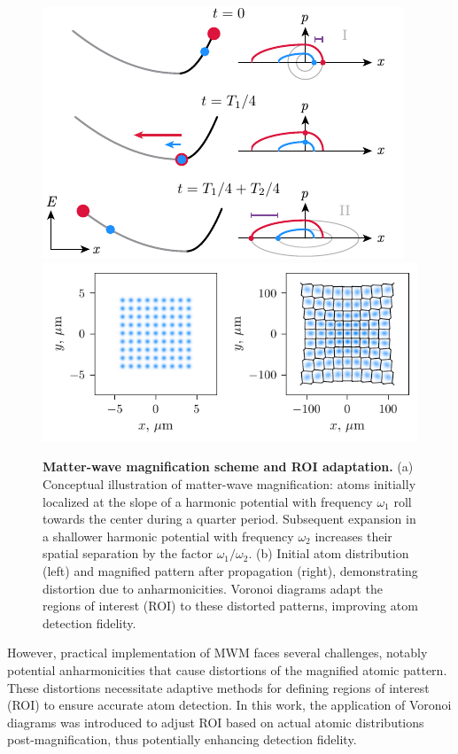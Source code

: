 \begin{figure}
    \centering
    \includegraphics{fig-ai/mwm-scheme.pdf}
    \includegraphics{fig-py/mwm.pdf}
    \caption{
    \textbf{Matter-wave magnification scheme and ROI adaptation.}
    (a) Conceptual illustration of matter-wave magnification: atoms initially localized at the slope of a harmonic potential with frequency $\omega_1$ roll towards the center during a quarter period. Subsequent expansion in a shallower harmonic potential with frequency $\omega_2$ increases their spatial separation by the factor $\omega_1/\omega_2$.
    (b) Initial atom distribution (left) and magnified pattern after propagation (right), demonstrating distortion due to anharmonicities. Voronoi diagrams adapt the regions of interest (ROI) to these distorted patterns, improving atom detection fidelity.
    }
    \label{fig:mwm}
\end{figure}

However, practical implementation of MWM faces several challenges, notably potential anharmonicities that cause distortions of the magnified atomic pattern. These distortions necessitate adaptive methods for defining regions of interest (ROI) to ensure accurate atom detection. In this work, the application of Voronoi diagrams was introduced to adjust ROI based on actual atomic distributions post-magnification, thus potentially enhancing detection fidelity.

